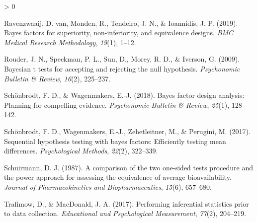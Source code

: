\documentclass[
  english,
  man,floatsintext]{apa6}
\newlength{\cslhangindent}
\newenvironment{CSLReferences}[2] %
 {%
  \setlength{\parindent}{0pt}
  \ifodd #1 \everypar{\setlength{\hangindent}{\cslhangindent}}\ignorespaces\fi
  \ifnum #2 > 0
  \setlength{\parskip}{#2\baselineskip}
  \fi
 }%
 {}
\begin{document}
\begin{CSLReferences}{1}{0}
\leavevmode\hypertarget{ref-van_ravenzwaaij_bayes_2019}{}%
Ravenzwaaij, D. van, Monden, R., Tendeiro, J. N., \& Ioannidis, J. P. (2019). Bayes factors for superiority, non-inferiority, and equivalence designs. \emph{{BMC} Medical Research Methodology}, \emph{19}(1), 1--12.

\leavevmode\hypertarget{ref-rouder_bayesian_2009}{}%
Rouder, J. N., Speckman, P. L., Sun, D., Morey, R. D., \& Iverson, G. (2009). Bayesian t tests for accepting and rejecting the null hypothesis. \emph{Psychonomic Bulletin \& Review}, \emph{16}(2), 225--237.

\leavevmode\hypertarget{ref-schonbrodt_bayes_2018}{}%
Schönbrodt, F. D., \& Wagenmakers, E.-J. (2018). Bayes factor design analysis: Planning for compelling evidence. \emph{Psychonomic Bulletin \& Review}, \emph{25}(1), 128--142.

\leavevmode\hypertarget{ref-schonbrodt_sequential_2017}{}%
Schönbrodt, F. D., Wagenmakers, E.-J., Zehetleitner, M., \& Perugini, M. (2017). Sequential hypothesis testing with bayes factors: Efficiently testing mean differences. \emph{Psychological Methods}, \emph{22}(2), 322--339.

\leavevmode\hypertarget{ref-schuirmann_comparison_1987}{}%
Schuirmann, D. J. (1987). A comparison of the two one-sided tests procedure and the power approach for assessing the equivalence of average bioavailability. \emph{Journal of Pharmacokinetics and Biopharmaceutics}, \emph{15}(6), 657--680.

\leavevmode\hypertarget{ref-trafimow_performing_2017}{}%
Trafimow, D., \& MacDonald, J. A. (2017). Performing inferential statistics prior to data collection. \emph{Educational and Psychological Measurement}, \emph{77}(2), 204--219.

\end{CSLReferences}

\endgroup
\end{document}
